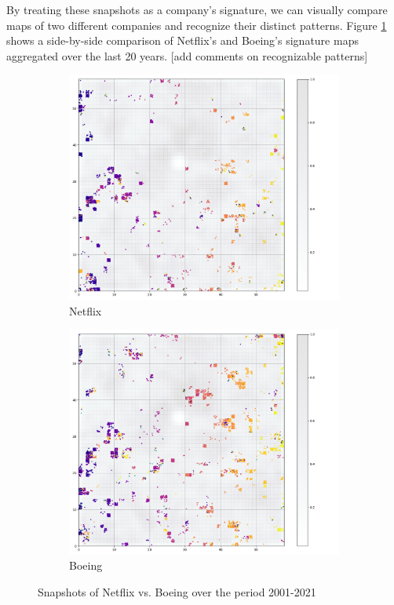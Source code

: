 By treating these snapshots as a company's signature, we can visually compare maps of two different companies and recognize their distinct patterns. Figure \ref{fig:nflx_ba} shows a side-by-side comparison of Netflix's and Boeing's signature maps aggregated over the last 20 years.  
[add comments on recognizable patterns]

\begin{figure}
     \centering
     \begin{subfigure}[b]{0.45\textwidth}
         \centering
         \includegraphics[width=\textwidth]{figures/NFLX_all.png}
         \caption{Netflix}
     \end{subfigure}
     \hfill
     \begin{subfigure}[b]{0.45\textwidth}
         \centering
         \includegraphics[width=\textwidth]{figures/BA_all.png}
         \caption{Boeing}
     \end{subfigure}

        \caption{Snapshots of Netflix vs. Boeing over the period 2001-2021}
        \label{fig:nflx_ba}
\end{figure}



